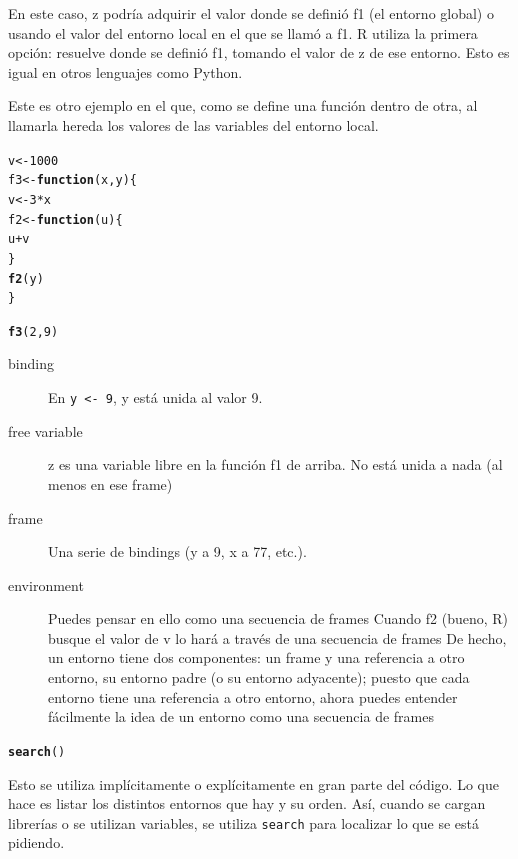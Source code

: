 \documentclass{config/apuntes}\usepackage[]{graphicx}\usepackage[]{xcolor}
\makeatletter
\newcommand{\hlnum}[1]{\textcolor[rgb]{0.686,0.059,0.569}{#1}}%
\newcommand{\hlopt}[1]{\textcolor[rgb]{0,0,0}{#1}}%
\newcommand{\hldef}[1]{\textcolor[rgb]{0.345,0.345,0.345}{#1}}%
\newcommand{\hlkwa}[1]{\textcolor[rgb]{0.161,0.373,0.58}{\textbf{#1}}}%
\newcommand{\hlkwb}[1]{\textcolor[rgb]{0.69,0.353,0.396}{#1}}%
\newcommand{\hlkwc}[1]{\textcolor[rgb]{0.333,0.667,0.333}{#1}}%
\newcommand{\hlkwd}[1]{\textcolor[rgb]{0.737,0.353,0.396}{\textbf{#1}}}%
\newenvironment{kframe}{%
 \def\at@end@of@kframe{}%
 \ifinner\ifhmode%
  \def\at@end@of@kframe{\end{minipage}}%
  \begin{minipage}{\columnwidth}%
 \fi\fi%
 \def\FrameCommand##1{\hskip\@totalleftmargin \hskip-\fboxsep
 \colorbox{shadecolor}{##1}\hskip-\fboxsep
     \hskip-\linewidth \hskip-\@totalleftmargin \hskip\columnwidth}%
 \MakeFramed {\advance\hsize-\width
   \@totalleftmargin\z@ \linewidth\hsize
   \@setminipage}}%
 {\par\unskip\endMakeFramed%
 \at@end@of@kframe}
\newenvironment{knitrout}{}{} %
\newcommand{\code}[1]{\texttt{#1}}
\makeatother
\begin{document}
En este caso, z podría adquirir el valor donde se definió f1 (el entorno global) o usando el valor del entorno local en el que se llamó a f1. R utiliza la primera opción: resuelve donde se definió f1, tomando el valor de z de ese entorno. Esto es igual en otros lenguajes como Python. 

Este es otro ejemplo en el que, como se define una función dentro de otra, al llamarla hereda los valores de las variables del entorno local.
\begin{knitrout}
\color{fgcolor}\begin{kframe}
\begin{alltt}
\hldef{v} \hlkwb{<-} \hlnum{1000}
\hldef{f3} \hlkwb{<-} \hlkwa{function}\hldef{(}\hlkwc{x}\hldef{,} \hlkwc{y}\hldef{) \{}
    \hldef{v} \hlkwb{<-} \hlnum{3} \hlopt{*} \hldef{x}
    \hldef{f2} \hlkwb{<-} \hlkwa{function}\hldef{(}\hlkwc{u}\hldef{) \{}
        \hldef{u} \hlopt{+} \hldef{v}
    \hldef{\}}
    \hlkwd{f2}\hldef{(y)}
\hldef{\}}

\hlkwd{f3}\hldef{(}\hlnum{2}\hldef{,} \hlnum{9}\hldef{)}
\end{alltt}
\end{kframe}
\end{knitrout}

\begin{description}
\item[binding] En \code{y <- 9}, y está unida al valor 9. 
\item[free variable] z es una variable libre en la función f1 de arriba. No está unida a nada (al menos en ese frame) 
\item[frame] Una serie de bindings (y a 9, x a 77, etc.).
\item[environment] Puedes pensar en ello como una secuencia de frames Cuando f2 (bueno, R) busque el valor de v lo hará a través de una secuencia de frames  De hecho, un entorno tiene dos componentes: un frame y una referencia a otro entorno, su entorno padre (o su entorno adyacente); puesto que cada entorno tiene una referencia a otro entorno, ahora puedes entender fácilmente la idea de un entorno como una secuencia de frames
\end{description}

\begin{knitrout}
\color{fgcolor}\begin{kframe}
\begin{alltt}
\hlkwd{search}\hldef{()}
\end{alltt}
\end{kframe}
\end{knitrout}
Esto se utiliza implícitamente o explícitamente en gran parte del código. Lo que hace es listar los distintos entornos que hay y su orden. Así, cuando se cargan librerías o se utilizan variables, se utiliza \code{search} para localizar lo que se está pidiendo. 
\end{document}
